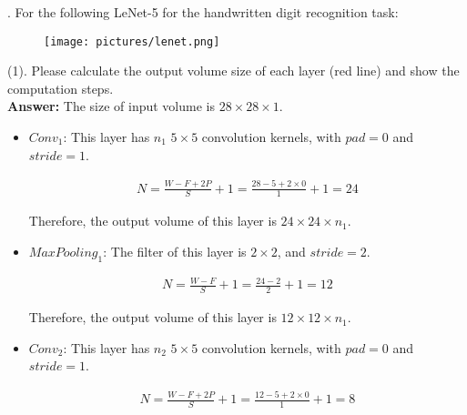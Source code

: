 \documentclass{article}
\begin{document}
. For the following LeNet-5 for the handwritten digit recognition task: 

\begin{figure}[tbh!]
\centering
\texttt{[image: pictures/lenet.png]}
\end{figure}

(1). Please calculate the output volume size of each layer (red line) and show the computation steps.  \\

\textbf{Answer:} The size of input volume is $28 \times 28 \times 1$.

\begin{itemize}
    \item $Conv_1$: This layer has $n_1$ $5 \times 5$ convolution kernels, with $pad = 0$ and $stride = 1$. 
    
    \begin{equation}\tag{$1$}
        \begin{aligned}
            N = \frac{W - F + 2P}{S} + 1 = \frac{28 - 5 + 2 \times 0}{1} + 1 = 24
        \end{aligned}
    \end{equation}
    
    Therefore, the output volume of this layer is $24 \times 24 \times n_1$.
    
    \item $MaxPooling_1$: The filter of this layer is $2 \times 2$, and $stride = 2$. 
    
   \begin{equation}\tag{$2$}
        \begin{aligned}
            N = \frac{W - F}{S} + 1 = \frac{24 - 2}{2} + 1 = 12
        \end{aligned}
    \end{equation} 
    
    Therefore, the output volume of this layer is $12 \times 12 \times n_1$.
    
    \item $Conv_2$: This layer has $n_2$ $5 \times 5$ convolution kernels, with $pad = 0$ and $stride = 1$.
    
    \begin{equation}\tag{$3$}
        \begin{aligned}
            N = \frac{W - F + 2P}{S} + 1 = \frac{12 - 5 + 2 \times 0}{1} + 1 = 8
        \end{aligned}
    \end{equation}
    

\end{itemize}
\end{document}

